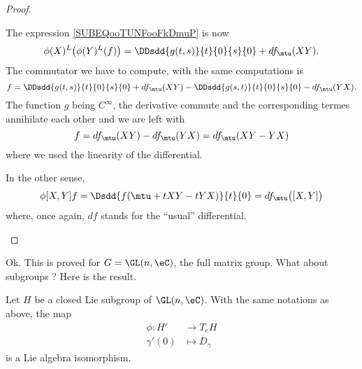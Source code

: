 \begin{proof}
\begin{subproof}
            The expression \eqref{SUBEQooTUNFooFkDmuP} is now
            \begin{equation}
                \phi(X)^L\big( \phi(Y)^L(f) \big)=\DDsdd{ g(t,s) }{t}{0}{s}{0}+df_{\mtu}(XY).
            \end{equation}
            The commutator we have to compute, with the same computations is
            \begin{equation}
                [\phi(X),\phi(Y)]f=\DDsdd{ g(t,s) }{t}{0}{s}{0}+df_{\mtu}(XY)-\DDsdd{ g(s,t) }{t}{0}{s}{0}-df_{\mtu}(YX).
            \end{equation}
            The function \( g\) being \(  C^{\infty}\), the derivative commute and the corresponding termes annihilate each other and we are left with
            \begin{equation}
                [\phi(X),\phi(Y)]f=df_{\mtu}(XY)-df_{\mtu}(YX)=df_{\mtu}(XY-YX)
            \end{equation}
            where we used the linearity of the differential.

            In the other sense,
            \begin{equation}
                \phi[X,Y]f=\Dsdd{ f(\mtu+tXY-tYX) }{t}{0}=df_{\mtu}\big( [X,Y] \big)
            \end{equation}
            where, once again, \( df\) stands for the ``usual'' differential.
    \end{subproof}
\end{proof}

Ok. This is proved for \( G=\GL(n,\eC)\), the full matrix group. What about subgroups ? Here is the result.

\begin{proposition}      \label{PROPooSQHLooGQAykc}
    Let \( H\) be a closed Lie subgroup of \( \GL(n,\eC)\). With the same notations as above, the map
    \begin{equation}
        \begin{aligned}
            \phi\colon H'&\to T_eH \\
            \gamma'(0)&\mapsto D_{\gamma} 
        \end{aligned}
    \end{equation}
    is a Lie algebra isomorphism.
\end{proposition}

